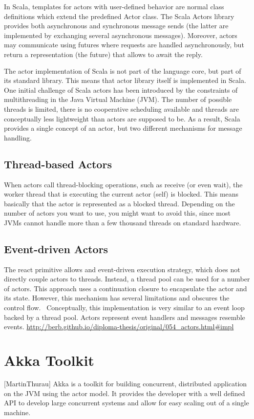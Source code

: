 In Scala, templates for actors with user-defined behavior are normal class definitions which extend the predefined Actor class.
The Scala Actors library provides both asynchronous and synchronous message sends (the latter are implemented by exchanging several asynchronous messages). Moreover, actors may communicate using futures where requests are handled asynchronously, but return a representation (the future) that allows to await the reply.~\parencite{scalaActors}

The actor implementation of Scala is not part of the language core, but part of its standard library. This means that actor library itself is implemented in Scala. One initial challenge of Scala actors has been introduced by the constraints of multithreading in the Java Virtual Machine (JVM). The number of possible threads is limited, there is no cooperative scheduling available and threads are conceptually less lightweight than actors are supposed to be. As a result, Scala provides a single concept of an actor, but two different mechanisms for message handling.~\parencite{Haller}

\subsection*{Thread-based Actors}
When actors call thread-blocking operations, such as receive (or even wait), the worker thread that is executing the current actor (self) is blocked. This means basically that the actor is represented as a blocked thread. Depending on the number of actors you want to use, you might want to avoid this, since most JVMs cannot handle more than a few thousand threads on standard hardware.

\subsection*{Event-driven Actors}
The react primitive allows and event-driven execution strategy, which does not directly couple actors to threads. Instead, a thread pool can be used for a number of actors. This approach uses a continuation closure to encapsulate the actor and its state. However, this mechanism has several limitations and obscures the control flow.~\cite{Haller} Conceptually, this implementation is very similar to an event loop backed by a thread pool. Actors represent event handlers and messages resemble events. \url{http://berb.github.io/diploma-thesis/original/054_actors.html#impl}

\section{Akka Toolkit}[MartinThurau]
Akka is a toolkit for building concurrent, distributed application on the JVM using the actor model. It provides the developer with a well defined API to develop large concurrent systems and allow for easy scaling out of a single machine.

